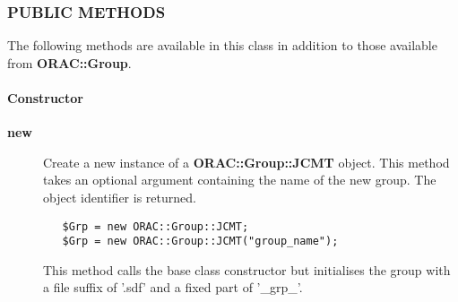 \subsubsection*{PUBLIC METHODS\label{ORAC::Group::JCMT_PUBLIC_METHODS}}

The following methods are available in this class in addition to
those available from \textbf{ORAC::Group}.

\paragraph*{Constructor\label{ORAC::Group::JCMT_Constructor}}\begin{description}
\item[\textbf{new}] \mbox{}

Create a new instance of a \textbf{ORAC::Group::JCMT} object.
This method takes an optional argument containing the
name of the new group. The object identifier is returned.

\begin{verbatim}
   $Grp = new ORAC::Group::JCMT;
   $Grp = new ORAC::Group::JCMT("group_name");
\end{verbatim}


This method calls the base class constructor but initialises
the group with a file suffix of '.sdf' and a fixed part
of '\_grp\_'.

\end{description}
